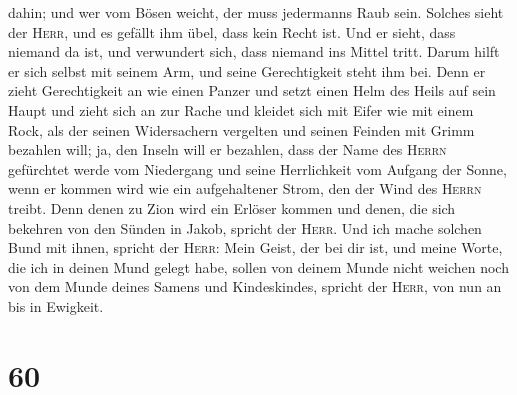dahin; und wer vom Bösen weicht, der muss jedermanns Raub sein. Solches
sieht der \textsc{Herr}, und es gefällt ihm übel, dass kein Recht ist.
 Und er sieht, dass niemand da ist, und verwundert sich,
dass niemand ins Mittel tritt. Darum hilft er sich selbst mit seinem
Arm, und seine Gerechtigkeit steht ihm bei.  Denn er
zieht Gerechtigkeit an wie einen Panzer und setzt einen Helm des Heils
auf sein Haupt und zieht sich an zur Rache und kleidet sich mit Eifer
wie mit einem Rock,  als der seinen Widersachern
vergelten und seinen Feinden mit Grimm bezahlen will; ja, den Inseln
will er bezahlen,  dass der Name des \textsc{Herrn}
gefürchtet werde vom Niedergang und seine Herrlichkeit vom Aufgang der
Sonne, wenn er kommen wird wie ein aufgehaltener Strom, den der Wind des
\textsc{Herrn} treibt.  Denn denen zu Zion wird ein
Erlöser kommen und denen, die sich bekehren von den Sünden in Jakob,
spricht der \textsc{Herr}.  Und ich mache solchen Bund
mit ihnen, spricht der \textsc{Herr}: Mein Geist, der bei dir ist, und
meine Worte, die ich in deinen Mund gelegt habe, sollen von deinem Munde
nicht weichen noch von dem Munde deines Samens und Kindeskindes, spricht
der \textsc{Herr}, von nun an bis in Ewigkeit.

\hypertarget{section-59}{%
\section{60}\label{section-59}}

